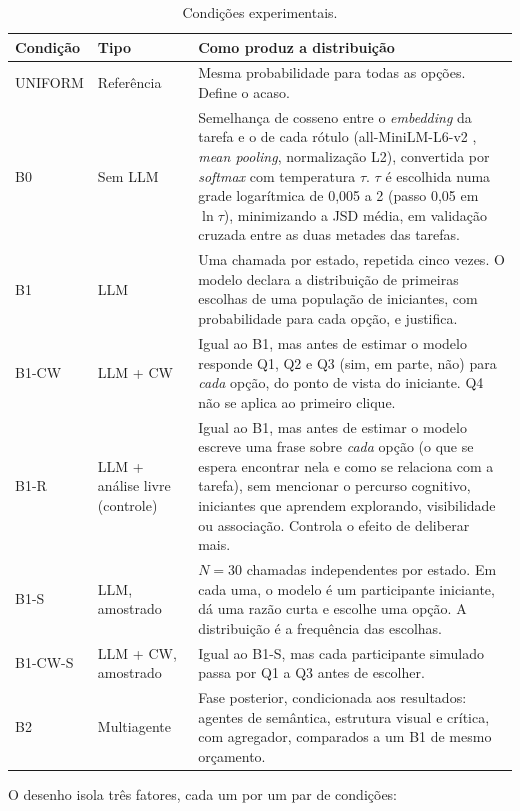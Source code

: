 \documentclass[12pt,oneside,a4paper,chapter=TITLE,english,brazil]{abntex2}
\begin{document}
\begin{table}[htb]
\centering
\caption{Condições experimentais.}
\label{tab:condicoes}
\scriptsize
\begin{tabularx}{\textwidth}{@{}p{1.5cm}p{2.0cm}Y@{}}
\toprule
\textbf{Condição} & \textbf{Tipo} & \textbf{Como produz a distribuição} \\
\midrule
UNIFORM & Referência & Mesma probabilidade para todas as opções. Define o acaso. \\
B0 & Sem LLM & Semelhança de cosseno entre o \textit{embedding} da tarefa e o de cada rótulo (all-MiniLM-L6-v2 \cite{wang2020minilm,reimers2019sbert}, \textit{mean pooling}, normalização L2), convertida por \textit{softmax} com temperatura $\tau$. $\tau$ é escolhida numa grade logarítmica de 0,005 a 2 (passo 0,05 em $\ln\tau$), minimizando a JSD média, em validação cruzada entre as duas metades das tarefas. \\
B1 & LLM & Uma chamada por estado, repetida cinco vezes. O modelo declara a distribuição de primeiras escolhas de uma população de iniciantes, com probabilidade para cada opção, e justifica. \\
B1-CW & LLM + CW & Igual ao B1, mas antes de estimar o modelo responde Q1, Q2 e Q3 (sim, em parte, não) para \emph{cada} opção, do ponto de vista do iniciante. Q4 não se aplica ao primeiro clique. \\
B1-R & LLM + análise livre (controle) & Igual ao B1, mas antes de estimar o modelo escreve uma frase sobre \emph{cada} opção (o que se espera encontrar nela e como se relaciona com a tarefa), sem mencionar o percurso cognitivo, iniciantes que aprendem explorando, visibilidade ou associação. Controla o efeito de deliberar mais. \\
B1-S & LLM, amostrado & $N=30$ chamadas independentes por estado. Em cada uma, o modelo é um participante iniciante, dá uma razão curta e escolhe uma opção. A distribuição é a frequência das escolhas. \\
B1-CW-S & LLM + CW, amostrado & Igual ao B1-S, mas cada participante simulado passa por Q1 a Q3 antes de escolher. \\
B2 & Multiagente & Fase posterior, condicionada aos resultados: agentes de semântica, estrutura visual e crítica, com agregador, comparados a um B1 de mesmo orçamento. \\
\bottomrule
\end{tabularx}
\end{table}

O desenho isola três fatores, cada um por um par de condições:
\end{document}

